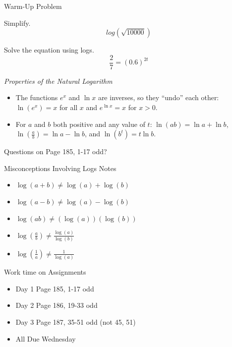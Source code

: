 \documentclass[ignorenonframetext,]{beamer}
\providecommand{\tightlist}{%
  \setlength{\itemsep}{0pt}\setlength{\parskip}{0pt}}
\begin{document}
\begin{frame}{Warm-Up Problem}

Simplify. \[log(\sqrt{10000})\]

Solve the equation using logs. \[\frac{2}{7} = (0.6)^{2t}\]

\emph{Properties of the Natural Logarithm}

\begin{itemize}
\tightlist
\item
  The functions \(e^x\) and \(\ln x\) are inverses, so they ``undo''
  each other: \(\ln(e^x) = x\) for all \(x\) and \(e^{\ln x} = x\) for
  \(x > 0\).
\item
  For \(a\) and \(b\) both positive and any value of \(t\):
  \(\ln (ab) = \ln a + \ln b\),
  \(\ln \left(\frac{a}{b}\right) = \ln a - \ln b\), and
  \(\ln (b^t) = t\ln b\).
\end{itemize}

\end{frame}

\begin{frame}{Questions on Page 185, 1-17 odd?}

\end{frame}

\begin{frame}{Misconceptions Involving Logs Notes}

\begin{itemize}
\tightlist
\item
  \(\log(a+b) \neq \log(a) + \log(b)\)
\item
  \(\log(a-b) \neq \log(a) - \log(b)\)
\item
  \(\log(ab) \neq (\log(a))(\log(b))\)
\item
  \(\log\left(\frac{a}{b}\right) \neq \frac{\log(a)}{\log(b)}\)
\item
  \(\log\left(\frac{1}{a}\right) \neq \frac{1}{\log(a)}\)
\end{itemize}

\end{frame}

\begin{frame}{Work time on Assignments}

\begin{itemize}
\tightlist
\item
  Day 1 Page 185, 1-17 odd
\item
  Day 2 Page 186, 19-33 odd
\item
  Day 3 Page 187, 35-51 odd (not 45, 51)
\item
  All Due Wednesday
\end{itemize}

\end{frame}
\end{document}
